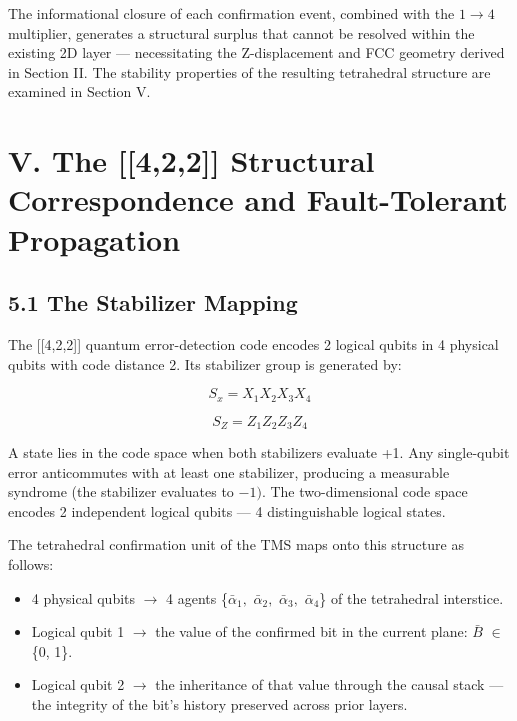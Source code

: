 \documentclass[11pt,oneside]{report}
\theoremstyle{definition}
\theoremstyle{remark}
\begin{document}
The informational closure of each confirmation event, combined with the
\ensuremath{1\to 4} multiplier, generates a structural surplus that cannot be resolved
within the existing 2D layer --- necessitating the Z-displacement and
FCC geometry derived in Section II. The stability properties of the
resulting tetrahedral structure are examined in Section V.

\section*{V. The [[4,2,2]] Structural Correspondence and Fault-Tolerant Propagation}

\subsection*{5.1 The Stabilizer Mapping}

The [[4,2,2]] quantum error-detection code encodes 2 logical
qubits in 4 physical qubits with code distance 2. Its stabilizer group
is generated by:

\begin{equation*}
S_{x} = X_{1}X_{2}X_{3}X_{4}
\end{equation*}

\begin{equation*}
S_{Z} = Z_{1}Z_{2}Z_{3}Z_{4}
\end{equation*}

A state lies in the code space when both stabilizers evaluate +1. Any
single-qubit error anticommutes with at least one stabilizer, producing
a measurable syndrome (the stabilizer evaluates to \ensuremath{-1).} The
two-dimensional code space encodes 2 independent logical qubits --- 4
distinguishable logical states.

The tetrahedral confirmation unit of the TMS maps onto this structure as
follows:

\begin{itemize}
\item
  4 physical qubits \ensuremath{\to} 4 agents \{\ensuremath{\bar{\alpha}_{1},} \ensuremath{\bar{\alpha}_{2},} \ensuremath{\bar{\alpha}_{3},} \ensuremath{\bar{\alpha}_{4}}\} of the tetrahedral
  interstice.
\item
  Logical qubit 1 \ensuremath{\to} the value of the confirmed bit in the current plane:
  \ensuremath{\bar{B}} \ensuremath{\in} \{0, 1\}.
\item
  Logical qubit 2 \ensuremath{\to} the inheritance of that value through the causal
  stack --- the integrity of the bit's history preserved across prior
  layers.
\end{itemize}
\end{document}
